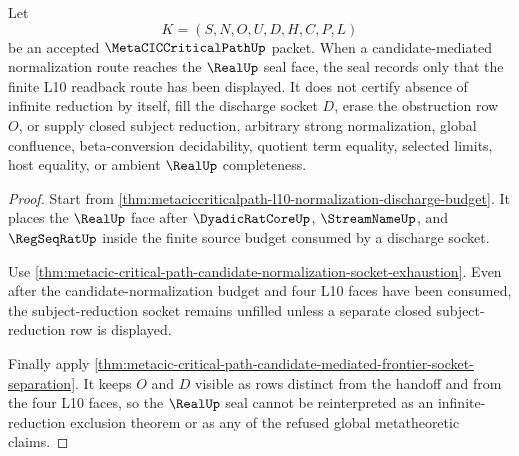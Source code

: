 \begin{theorem}
\label{thm:metaciccriticalpath-real-seal-no-infinite-reduction-handoff}
Let
$$
K=(S,N,O,U,D,H,C,P,L)
$$
be an accepted $\MetaCICCriticalPathUp$ packet. When a candidate-mediated normalization route reaches the $\RealUp$ seal face, the seal records only that the finite L10 readback route has been displayed. It does not certify absence of infinite reduction by itself, fill the discharge socket $D$, erase the obstruction row $O$, or supply closed subject reduction, arbitrary strong normalization, global confluence, beta-conversion decidability, quotient term equality, selected limits, host equality, or ambient $\RealUp$ completeness.
\end{theorem}
\begin{proof}
Start from \autoref{thm:metaciccriticalpath-l10-normalization-discharge-budget}. It places the $\RealUp$ face after $\DyadicRatCoreUp$, $\StreamNameUp$, and $\RegSeqRatUp$ inside the finite source budget consumed by a discharge socket.

Use \autoref{thm:metacic-critical-path-candidate-normalization-socket-exhaustion}. Even after the candidate-normalization budget and four L10 faces have been consumed, the subject-reduction socket remains unfilled unless a separate closed subject-reduction row is displayed.

Finally apply \autoref{thm:metacic-critical-path-candidate-mediated-frontier-socket-separation}. It keeps $O$ and $D$ visible as rows distinct from the handoff and from the four L10 faces, so the $\RealUp$ seal cannot be reinterpreted as an infinite-reduction exclusion theorem or as any of the refused global metatheoretic claims.
\end{proof}

